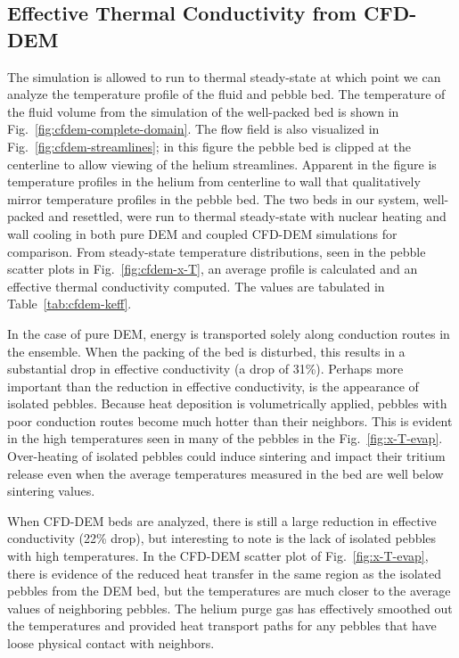 \subsection{Effective Thermal Conductivity from CFD-DEM}\label{sec:cfd-dem-effective-conductivity}

The simulation is allowed to run to thermal steady-state at which point we can analyze the temperature profile of the fluid and pebble bed. The temperature of the fluid volume from the simulation of the well-packed bed is shown in Fig.~\ref{fig:cfdem-complete-domain}. The flow field is also visualized in Fig.~\ref{fig:cfdem-streamlines}; in this figure the pebble bed is clipped at the centerline to allow viewing of the helium streamlines. Apparent in the figure is temperature profiles in the helium from centerline to wall that qualitatively mirror temperature profiles in the pebble bed. The two beds in our system, well-packed and resettled, were run to thermal steady-state with nuclear heating and wall cooling in both pure DEM and coupled CFD-DEM simulations for comparison. From steady-state temperature distributions, seen in the pebble scatter plots in Fig.~\ref{fig:cfdem-x-T}, an average profile is calculated and an effective thermal conductivity computed. The values are tabulated in Table~\ref{tab:cfdem-keff}. 

In the case of pure DEM, energy is transported solely along conduction routes in the ensemble. When the packing of the bed is disturbed, this results in a substantial drop in effective conductivity (a drop of 31\%). Perhaps more important than the reduction in effective conductivity, is the appearance of isolated pebbles. Because heat deposition is volumetrically applied, pebbles with poor conduction routes become much hotter than their neighbors. This is evident in the high temperatures seen in many of the pebbles in the Fig.~\ref{fig:x-T-evap}. Over-heating of isolated pebbles could induce sintering and impact their tritium release even when the average temperatures measured in the bed are well below sintering values.

When CFD-DEM beds are analyzed, there is still a large reduction in effective conductivity (22\% drop), but interesting to note is the lack of isolated pebbles with high temperatures. In the CFD-DEM scatter plot of Fig.~\ref{fig:x-T-evap}, there is evidence of the reduced heat transfer in the same region as the isolated pebbles from the DEM bed, but the temperatures are much closer to the average values of neighboring pebbles. The helium purge gas has effectively smoothed out the temperatures and provided heat transport paths for any pebbles that have loose physical contact with neighbors.

